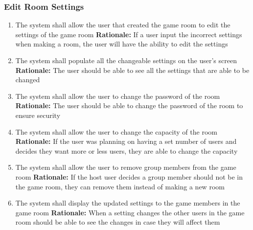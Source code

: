 \documentclass[12pt]{article}
\begin{document}
\subsubsection{Edit Room Settings}
\begin{enumerate}[label=RS\arabic*., series=EditRoom]
	\item The system shall allow the user that created the game room to edit the settings of the game room\newline 
    \textbf{Rationale:} If a user input the incorrect settings when making a room, the user will have the ability to edit the settings 
    \item The system shall populate all the changeable settings on the user's screen\newline 
    \textbf{Rationale:} The user should be able to see all the settings that are able to be changed
    \item The system shall allow the user to change the password of the room\newline 
    \textbf{Rationale:} The user should be able to change the password of the room to ensure security
    \item The system shall allow the user to change the capacity of the room\newline 
    \textbf{Rationale:} If the user was planning on having a set number of users and decides they want more or less users, they are able to change the capacity
    \item The system shall allow the user to remove group members from the game room\newline 
    \textbf{Rationale:} If the host user decides a group member should not be in the game room, they can remove them instead of making a new room
    \item The system shall display the updated settings to the game members in the game room\newline 
    \textbf{Rationale:} When a setting changes the other users in the game room should be able to see the changes in case they will affect them
\end{enumerate}
\end{document}
